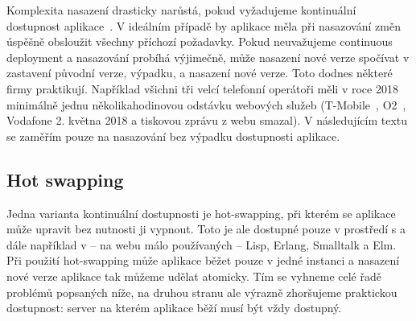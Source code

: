         Komplexita nasazení drasticky narůstá, pokud vyžadujeme kontinuální dostupnost aplikace~\cite{beyer2016site}. V ideálním případě by aplikace měla při nasazování změn úspěšně obsloužit všechny příchozí požadavky. Pokud neuvažujeme continuous deployment a nasazování probíhá výjimečně, může nasazení nové verze spočívat v zastavení původní verze, výpadku, a nasazení nové verze. Toto dodnes některé firmy praktikují. Například všichni tři velcí telefonní operátoři měli v roce 2018 minimálně jednu několikahodinovou odstávku webových služeb (T-Mobile~\cite{tmobile-odstavka}, O2~\cite{o2-odstavka}, Vodafone 2. května 2018 a tiskovou zprávu z webu smazal). V následujícím textu se zaměřím pouze na nasazování bez výpadku dostupnosti aplikace.

        \subsection*{Hot swapping}
            Jedna varianta kontinuální dostupnosti je hot-swapping, při kterém se aplikace může upravit bez nutnosti ji vypnout. Toto je ale dostupné pouze v prostředí s  a dále například v -- na webu málo používaných -- Lisp, Erlang, Smalltalk a Elm. Při použití hot-swapping může aplikace běžet pouze v jedné instanci a nasazení nové verze aplikace tak můžeme udělat atomicky. Tím se vyhneme celé řadě problémů popsaných níže, na druhou stranu ale výrazně zhoršujeme praktickou dostupnost: server na kterém aplikace běží musí být vždy dostupný.

